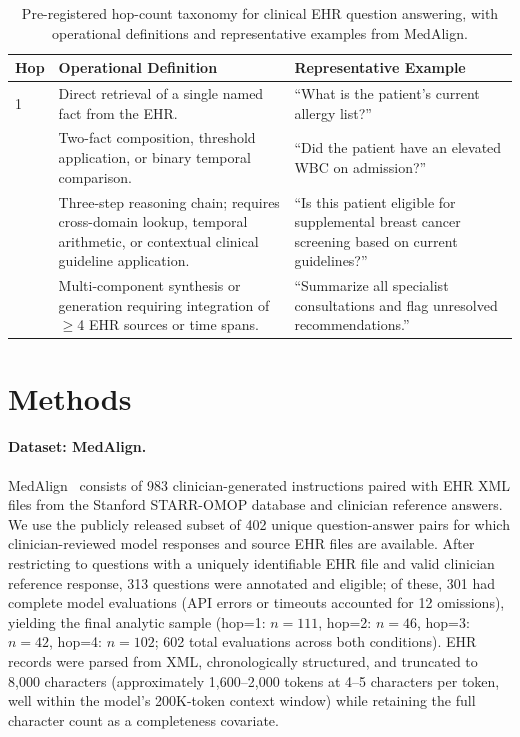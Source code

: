 \documentclass{article}
\begin{document}
\begin{table}[t]
\centering
\caption{Pre-registered hop-count taxonomy for clinical EHR question answering,
with operational definitions and representative examples from MedAlign.}
\label{tab:hop_taxonomy}
\small
\begin{tabular}{@{}lp{4.5cm}p{5.5cm}@{}}
\toprule
\textbf{Hop} & \textbf{Operational Definition} & \textbf{Representative Example} \\
\midrule
1 & Direct retrieval of a single named fact from the EHR.
  & ``What is the patient's current allergy list?'' \\
\addlinespace
2 & Two-fact composition, threshold application, or binary temporal comparison.
  & ``Did the patient have an elevated WBC on admission?'' \\
\addlinespace
3 & Three-step reasoning chain; requires cross-domain lookup, temporal arithmetic, or contextual clinical guideline application.
  & ``Is this patient eligible for supplemental breast cancer screening based on current guidelines?'' \\
\addlinespace
4 & Multi-component synthesis or generation requiring integration of $\geq$4 EHR sources or time spans.
  & ``Summarize all specialist consultations and flag unresolved recommendations.'' \\
\bottomrule
\end{tabular}
\end{table}

\section{Methods}

\paragraph{Dataset: MedAlign.}
MedAlign~\citep{wornow2024medalign} consists of 983 clinician-generated
instructions paired with EHR XML files from the Stanford STARR-OMOP database
and clinician reference answers. We use the publicly released
subset of 402 unique question-answer pairs for which clinician-reviewed model
responses and source EHR files are available. After restricting to
questions with a uniquely identifiable EHR file and valid clinician reference
response, 313 questions were annotated and eligible; of these, 301 had
complete model evaluations (API errors or timeouts accounted for 12 omissions),
yielding the final analytic sample
(hop=1: $n=111$, hop=2: $n=46$, hop=3: $n=42$, hop=4: $n=102$;
602 total evaluations across both conditions).
EHR records were parsed from XML, chronologically structured, and truncated
to 8,000 characters (approximately 1,600--2,000 tokens at 4--5 characters per token,
well within the model's 200K-token context window) while retaining
the full character count as a completeness covariate.
\end{document}
